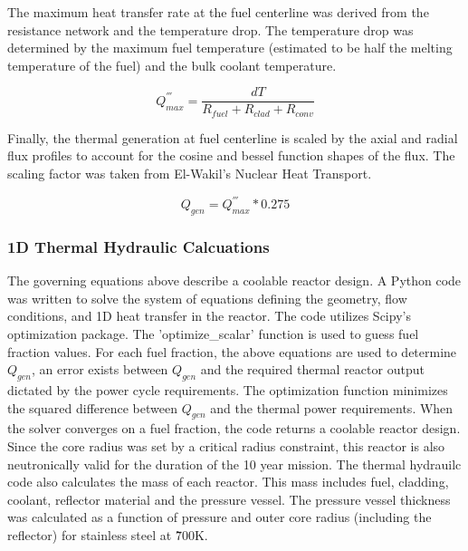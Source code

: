 The maximum heat transfer rate at the fuel centerline was derived from the
resistance network and the temperature drop. The temperature drop was determined
by the maximum fuel temperature (estimated to be half the melting temperature of
the fuel) and the bulk coolant temperature.

\begin{equation}
    Q^{'''}_{max} = \frac{dT}{R_{fuel} + R_{clad} + R_{conv}}
\end{equation}

Finally, the thermal generation at fuel centerline is scaled by the axial and
radial flux profiles to account for the cosine and bessel function shapes of the
flux. The scaling factor was taken from El-Wakil's Nuclear Heat Transport.

\begin{equation}
    Q_{gen} = Q^{'''}_{max} * 0.275
\end{equation}

\subsubsection{1D Thermal Hydraulic Calcuations}

    The governing equations above describe a coolable
reactor design. A Python code was written to solve the system of equations
defining the geometry, flow conditions, and 1D heat transfer in the reactor. The
code utilizes Scipy's optimization package. The 'optimize\_scalar' function is
used to guess fuel fraction values. For each fuel fraction, the above equations
are used to determine $Q_{gen}$, an error exists between $Q_{gen}$ and the
required thermal reactor output dictated by the power cycle requirements. The
optimization function minimizes the squared difference between $Q_{gen}$ and the
thermal power requirements. When the solver converges on a fuel fraction, the
code returns a coolable reactor design. Since the core radius was set by a
critical radius constraint, this reactor is also neutronically valid for the
duration of the 10 year mission.
    The thermal hydrauilc code also calculates the mass of each reactor. This
mass includes fuel, cladding, coolant, reflector material and the pressure
vessel. The pressure vessel thickness was calculated as a function of pressure
and outer core radius (including the reflector) for stainless steel at \~700K.

